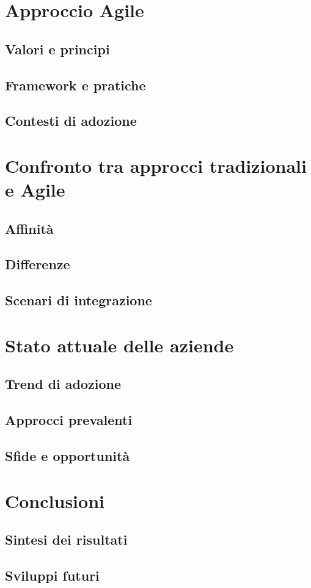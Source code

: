 \documentclass[12pt,a4paper]{article}
\begin{document}
\section{Approccio Agile}
\subsection{Valori e principi}
\subsection{Framework e pratiche}
\subsection{Contesti di adozione}

\section{Confronto tra approcci tradizionali e Agile}
\subsection{Affinità}
\subsection{Differenze}
\subsection{Scenari di integrazione}

\section{Stato attuale delle aziende}
\subsection{Trend di adozione}
\subsection{Approcci prevalenti}
\subsection{Sfide e opportunità}

\section{Conclusioni}
\subsection{Sintesi dei risultati}
\subsection{Sviluppi futuri}
\end{document}
